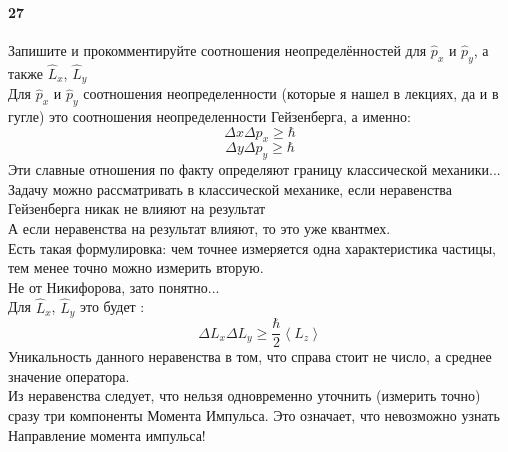 


\paragraph{27} Запишите и прокомментируйте соотношения неопределённостей для $\hat{p}_x$ и $\hat{p}_y$, а также $\hat{L}_x$, $\hat{L}_y$\\
Для $\hat{p}_x$ и $\hat{p}_y$ соотношения неопределенности (которые я нашел в лекциях, да и в гугле) это соотношения неопределенности Гейзенберга, а именно:
$$\Delta x \Delta p_x\ge \hbar$$
$$\Delta y \Delta p_y\ge \hbar$$
Эти славные отношения по факту определяют границу классической механики...\\
Задачу можно рассматривать в классической механике, если неравенства Гейзенберга никак не влияют на результат\\
А если неравенства на результат влияют, то это уже квантмех.\\
Есть такая формулировка: чем точнее измеряется одна характеристика частицы, тем менее точно можно измерить вторую.\\
Не от Никифорова, зато понятно...\\
Для  $\hat{L}_x$, $\hat{L}_y$ это будет :\\
$$\Delta L_x \Delta L_y\ge \frac{\hbar}{2}\left<L_z\right>$$
Уникальность данного неравенства в том, что справа стоит не число, а среднее значение оператора.\\
Из неравенства следует, что нельзя одновременно уточнить (измерить точно) сразу три компоненты Момента Импульса. Это означает, что невозможно узнать Направление момента импульса!\\
